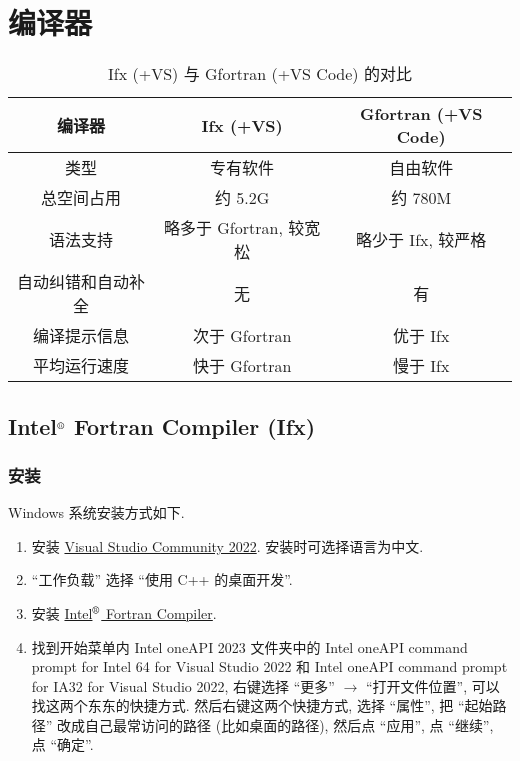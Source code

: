 \chapter{编译器}\label{fortran_compiler}
\def\r{${}^\text{\textregistered}$}

\begin{table}[!htbp]
    \centering
    \begin{tabular}{|c|c|c|}
        \hline
        编译器&Ifx (+VS)&Gfortran (+VS Code)\\
        \hline
        类型&专有软件&自由软件\\
        \hline
        总空间占用&约 5.2G&约 780M\\
        \hline
        语法支持&略多于 Gfortran, 较宽松&略少于 Ifx, 较严格\\
        \hline
        自动纠错和自动补全&无&有\\
        \hline
        编译提示信息&次于 Gfortran&优于 Ifx\\
        \hline
        平均运行速度&快于 Gfortran&慢于 Ifx\\
        \hline
    \end{tabular}
    \caption{Ifx (+VS) 与 Gfortran (+VS Code) 的对比}
\end{table}

\section[Intel\r{} Fortran Compiler]{Intel\r{} Fortran Compiler (Ifx)}

\subsection{安装}

Windows 系统安装方式如下.
\begin{enumerate}
    \item 安装 \href{https://visualstudio.microsoft.com/zh-hans/thank-you-downloading-visual-studio/?sku=Community&channel=Release&version=VS2022&source=VSLandingPage&cid=2030&passive=false}
    {Visual Studio Community 2022}. 安装时可选择语言为中文.
    \item ``工作负载'' 选择 ``使用 C++ 的桌面开发''.
    \item 安装 \href{https://registrationcenter-download.intel.com/akdlm/IRC_NAS/7feb5647-59dd-420d-8753-345d31e177dc/w_fortran-compiler_p_2024.2.0.424.exe}{Intel\r{} Fortran Compiler}.
    \item 找到开始菜单内 Intel oneAPI 2023 文件夹中的 Intel oneAPI command prompt for Intel 64 for Visual Studio 2022 和 Intel oneAPI command prompt for IA32 for Visual Studio 2022, 右键选择 ``更多'' $\rightarrow$ ``打开文件位置'', 可以找这两个东东的快捷方式. 然后右键这两个快捷方式, 选择 ``属性'', 把 ``起始路径'' 改成自己最常访问的路径 (比如桌面的路径), 然后点 ``应用'', 点 ``继续'', 点 ``确定''.\label{to_desktop}
\end{enumerate}

